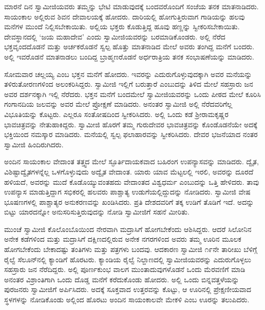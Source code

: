  ಮಾರನೆ ದಿನ ಸ್ವಾಮೀಜಿಯವರು ತಮ್ಮನ್ನು ಭೇಟಿ ಮಾಡುವುದಕ್ಕೆ ಬಂದವರೊಂದಿಗೆ ಸಂಜೆಯ ತನಕ ಮಾತನಾಡಿದರು. ಸಾಯಂಕಾಲ ಅಲ್ಲಿರುವ ಶಿವನ ದೇವಾಲಯಕ್ಕೆ ಹೋದರು. ದಾರಿಯಲ್ಲಿ ಹೋಗುತ್ತಿರುವಾಗ ಗಾಡಿಯನ್ನು ಹಲವು ಮನೆಗಳ ಮುಂದೆ ನಿಲ್ಲಿಸಬೇಕಾಯಿತು. ಅಲ್ಲಿಯ ಭಕ್ತರು ಕೊಡುತ್ತಿದ್ದ ಹೂವು ಹಣ್ಣನ್ನು ಸ್ವೀಕರಿಸಬೇಕಾಯಿತು. ದೇವಸ್ಥಾನದಲ್ಲಿ ‘ಜಯ ಮಹಾದೇವ’ ಎಂದು ಸ್ವಾಮೀಜಿಯವರನ್ನು ಬರಮಾಡಿಕೊಂಡರು. ಅಲ್ಲಿ ನೆರೆದ ಭಕ್ತವೃಂದದೊಡನೆ ಮತ್ತು ಅರ್ಚಕರೊಡನೆ ಸ್ವಲ್ಪ ಹೊತ್ತು ಮಾತನಾಡಿದ ಮೇಲೆ ಅವರು ತಂಗಿದ್ದ ಮನೆಗೆ ಬಂದರು. ಅಲ್ಲಿ ಇವರೊಡನೆ ಮಾತನಾಡಲು ಬಂದಿದ್ದ ಬ್ರಾಹ್ಮಣರೊಡನೆ ಅರ್ಧರಾತ್ರಿಯ ತನಕ ಸಂಭಾಷಣೆಯನ್ನು ಮಾಡಿದರು. 

 ಸೋಮವಾರ ಚಲ್ಲಯ್ಯ ಎಂಬ ಭಕ್ತನ ಮನೆಗೆ ಹೋದರು. ಇವರನ್ನು ಎದುರುಗೊಳ್ಳುವುದಕ್ಕಾಗಿ ಅವರ ಮನೆಯನ್ನು ತಳಿರುತೋರಣಗಳಿಂದ ಅಲಂಕರಿಸಿದ್ದರು. ಸ್ವಾಮೀಜಿ ಇಲ್ಲಿಗೆ ಬರುತ್ತಾರೆ ಎಂಬುದನ್ನು ತಿಳಿದ ಮೇಲೆ ಸಹಸ್ರಾರು ಜನ ಅವರ ದರ್ಶನಕ್ಕಾಗಿ ಇಲ್ಲಿ ನೆರೆದರು. ಭಕ್ತನ ಮನೆಗೆ ಬಂದಮೇಲೆ ಸ್ವಾಮೀಜಿಯವರನ್ನು ಒಂದು ಪೀಠದ ಮೇಲೆ ಕೂರಿಸಿ ಗಂಗಾನದಿಯ ಜಲವನ್ನು ಅವರ ಮೇಲೆ ಪ್ರೋಕ್ಷಣೆ ಮಾಡಿದರು. ಅನಂತರ ಸ್ವಾಮೀಜಿ ಅಲ್ಲಿ ನೆರೆದವರಿಗೆಲ್ಲ ವಿಭೂತಿಯನ್ನು ಕೊಟ್ಟರು. ಎಲ್ಲರೂ ಸಂತೋಷದಿಂದ ಸ್ವೀಕರಿಸಿದರು. ಅಲ್ಲಿ ಒಂದು ಕಡೆ ಶ‍್ರೀರಾಮಕೃಷ್ಣರ ಭಾವಚಿತ್ರವನ್ನು ನೇತುಹಾಕಿದ್ದರು. ಸ್ವಾಮೀಜಿ ಹೊರಗೆ ತಮ್ಮ ಗುರುದೇವರ ಭಾವಚಿತ್ರವನ್ನು ಕೊಂಡೊಡನೆಯೇ ಅದಕ್ಕೆ ಭಕ್ತಿಯಿಂದ ನಮಸ್ಕಾರ ಮಾಡಿದರು. ಮನೆಯಲ್ಲಿ ಸ್ವಲ್ಪ ಫಲಾಹಾರವನ್ನು ಸ್ವೀಕರಿಸಿದರು. ದೇವರ ಭಜನೆಯಾದ ನಂತರ ಸ್ವಾಮೀಜಿ ಹಿಂದಿರುಗಿದರು. 

 ಅಂದಿನ ಸಾಯಂಕಾಲ ವೇದಾಂತ ತತ್ತ್ವದ ಮೇಲೆ ಸ್ಫೂರ್ತಿದಾಯಕವಾದ ಬಹಿರಂಗ ಉಪನ್ಯಾಸವನ್ನು ಮಾಡಿದರು. ದ್ವೈತ, ವಿಶಿಷ್ಟಾದ್ವೈತಗಳನ್ನೆಲ್ಲ ಒಳಗೊಳ್ಳುವುದು ಅದ್ವೈತ ವೇದಾಂತ. ಯಾರು ಯಾವ ಮೆಟ್ಟಲಲ್ಲಿ ಇರಲಿ, ಅವರನ್ನು ದೂರದೆ ಹಳಿಯದೆ, ಅವರನ್ನು ಮುದೆ ಕೊಡೊಯ್ಯುವಂತಹದು ವೇದಾಂತದ ವಿಶ್ವಧರ್ಮ ಎಂಬುದನ್ನು ಒತ್ತಿ ಹೇಳಿದರು. ತಾವು ಉಪನ್ಯಾಸ ಮಾಡುತ್ತಿದ್ದಾಗ ಸಭಿಕರಲ್ಲಿ ಹಲವರು ಪಾಶ್ಚಾತ್ಯ ಉಡುಗೆಯಲ್ಲಿದ್ದುದನ್ನು ನೋಡಿದರು. ಸ್ವಾಮೀಜಿ ವೇಷ ಭೂಷಣಗಳಲ್ಲಿ ಪಾಶ್ಚಾತ್ಯರ ಅನುಕರಣವನ್ನು ಖಂಡಿಸಿದರು. ಪ್ರತಿ ದೇಶದವರಿಗೆ ತಕ್ಕ ಉಡಿಗೆ ತೊಡಿಗೆ ಇದೆ. ಅದನ್ನು ಬಿಟ್ಟು ಯಾರದನ್ನೋ ಅನುಸರಿಸುತ್ತಿರುವುದನ್ನು ನೋಡಿ ಸ್ವಾಮೀಜಿಗೆ ಸಹನೆ ಮೀರಿತು. 

 ಮುಂಚೆ ಸ್ವಾಮೀಜಿ ಕೊಲೊಂಬೊಯಿಂದ ನೇರವಾಗಿ ಮದ್ರಾಸಿಗೆ ಹೋಗಬೇಕೆಂದು ಆಶಿಸಿದ್ದರು. ಆದರೆ ಸಿಲೋನಿನ ಅನೇಕ ಕಡೆಗಳಿಂದ ಮತ್ತು ಮದ್ರಾಸಿಗೆ ದಕ್ಷಿಣದಲ್ಲಿರುವ ಅನೇಕ ನಗರಗಳಿಂದ ಅವರು ತಮ್ಮ ಊರಿನ ಮೂಲಕ ಹೋಗಬೇಕೆಂದು ಬೇಕಾದಷ್ಟು ತಂತಿಗಳು ಮತ್ತು ಪತ್ರಗಳು ಬಂದವು. ಆದಕಾರಣ ಸ್ವಾಮೀಜಿ ೧೯ನೇ ತಾರೀಖು ಬೆಳಿಗ್ಗೆ ರೈಲ್ವೆ ಸೆಲೂನ್‍ನಲ್ಲಿ ಕ್ಯಾಂಡಿಗೆ ಹೊರಟರು. ಕ್ಯಾಂಡಿಯ ರೈಲ್ವೆ ನಿಲ್ದಾಣದಲ್ಲಿ ಸ್ವಾಮೀಜಿಯವರನ್ನು ಎದುರುಗೊಳ್ಳಲು ಸಹಸ್ರಾರು ಜನ ನೆರೆದಿದ್ದರು. ಅಲ್ಲಿ ಪೂರ್ಣಕುಂಭ ವಾಲಗ ಮುಂತಾದುವುಗಳೊಡನೆ ಒಂದು ಮೆರವಣಿಗೆ ಮಾಡಿ ಅನಂತರ ವಿಶ್ರಾಂತಿಗಾಗಿ ಒಂದು ದೊಡ್ಡ ಮನೆಗೆ ಕರೆದುಕೊಂಡು ಹೋದರು. ಅಲ್ಲಿ ಒಂದು ಬಿನ್ನವತ್ತಳೆಯನ್ನು ಪುರಜನರು ಸ್ವಾಮೀಜಿಗೆ ಅರ್ಪಿಸಿದರು. ಅದಕ್ಕೆ ಸೂಕ್ತವಾದ ಉತ್ತರವನ್ನು ಕೊಟ್ಟು, ಆ ಊರಿನಲ್ಲಿ ಪ್ರೇಕ್ಷಣೀಯವಾದ ಸ್ಥಳಗಳನ್ನು ನೋಡಿಕೊಂಡು ಅಲ್ಲಿಂದ ಹೊರಟು ಅಂದಿನ ಸಾಯಂಕಾಲವೇ ಮೇಕಳಿ ಎಂಬ ಊರನ್ನು ತಲುಪಿದರು. 

